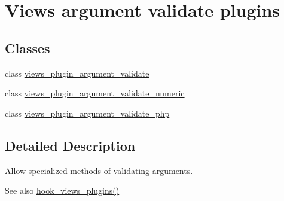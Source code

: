 \hypertarget{group__views__argument__validate__plugins}{
\section{Views argument validate plugins}
\label{group__views__argument__validate__plugins}
}
\subsection*{Classes}
\begin{DoxyCompactItemize}
\item 
class \hyperlink{classviews__plugin__argument__validate}{views\_\-plugin\_\-argument\_\-validate}
\item 
class \hyperlink{classviews__plugin__argument__validate__numeric}{views\_\-plugin\_\-argument\_\-validate\_\-numeric}
\item 
class \hyperlink{classviews__plugin__argument__validate__php}{views\_\-plugin\_\-argument\_\-validate\_\-php}
\end{DoxyCompactItemize}


\subsection{Detailed Description}
Allow specialized methods of validating arguments.

\begin{DoxySeeAlso}{See also}
\hyperlink{group__views__hooks_ga23f6e9972b2ed84fc54b7ff63f44477d}{hook\_\-views\_\-plugins()} 
\end{DoxySeeAlso}
